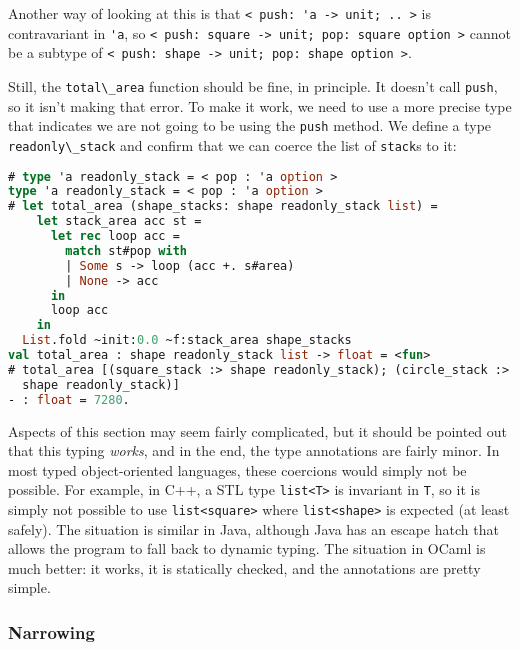 Another way of looking at this is that
\passthrough{\lstinline!< push: 'a -> unit; .. >!} is contravariant in
\passthrough{\lstinline!'a!}, so
\passthrough{\lstinline!< push: square -> unit; pop: square option >!}
cannot be a subtype of
\passthrough{\lstinline!< push: shape -> unit; pop: shape option >!}.

Still, the \passthrough{\lstinline!total\_area!} function should be
fine, in principle. It doesn't call \passthrough{\lstinline!push!}, so
it isn't making that error. To make it work, we need to use a more
precise type that indicates we are not going to be using the
\passthrough{\lstinline!push!} method. We define a type
\passthrough{\lstinline!readonly\_stack!} and confirm that we can coerce
the list of \passthrough{\lstinline!stack!}s to it:

\begin{lstlisting}[language=Caml]
# type 'a readonly_stack = < pop : 'a option >
type 'a readonly_stack = < pop : 'a option >
# let total_area (shape_stacks: shape readonly_stack list) =
    let stack_area acc st =
      let rec loop acc =
        match st#pop with
        | Some s -> loop (acc +. s#area)
        | None -> acc
      in
      loop acc
    in
  List.fold ~init:0.0 ~f:stack_area shape_stacks
val total_area : shape readonly_stack list -> float = <fun>
# total_area [(square_stack :> shape readonly_stack); (circle_stack :>
  shape readonly_stack)]
- : float = 7280.
\end{lstlisting}

Aspects of this section may seem fairly complicated, but it should be
pointed out that this typing \emph{works}, and in the end, the type
annotations are fairly minor. In most typed object-oriented languages,
these coercions would simply not be possible. For example, in C++, a STL
type \passthrough{\lstinline!list<T>!} is invariant in
\passthrough{\lstinline!T!}, so it is simply not possible to use
\passthrough{\lstinline!list<square>!} where
\passthrough{\lstinline!list<shape>!} is expected (at least safely). The
situation is similar in Java, although Java has an escape hatch that
allows the program to fall back to dynamic typing. The situation in
OCaml is much better: it works, it is statically checked, and the
annotations are pretty simple.~~

\hypertarget{narrowing}{%
\subsubsection{Narrowing}\label{narrowing}}

